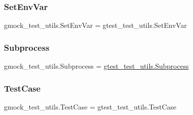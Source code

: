 \subsubsection{\texorpdfstring{SetEnvVar}{SetEnvVar}}
{\footnotesize\ttfamily gmock\+\_\+test\+\_\+utils.\+Set\+Env\+Var = gtest\+\_\+test\+\_\+utils.\+Set\+Env\+Var}

\mbox{\label{namespacegmock__test__utils_a31a0e33565ec805d314cb0a4eb8317e6}} 
\subsubsection{\texorpdfstring{Subprocess}{Subprocess}}
{\footnotesize\ttfamily gmock\+\_\+test\+\_\+utils.\+Subprocess = \mbox{\hyperlink{classgtest__test__utils_1_1Subprocess}{gtest\+\_\+test\+\_\+utils.\+Subprocess}}}

\mbox{\label{namespacegmock__test__utils_a959c5af591e4d49b6d35745205b64509}} 
\subsubsection{\texorpdfstring{TestCase}{TestCase}}
{\footnotesize\ttfamily gmock\+\_\+test\+\_\+utils.\+Test\+Case = gtest\+\_\+test\+\_\+utils.\+Test\+Case}

